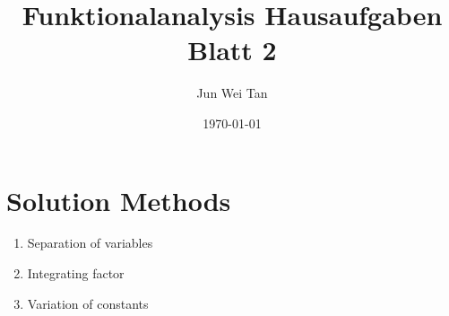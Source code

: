 \documentclass[prb,12pt]{revtex4-2}
\theoremstyle{definition}
\theoremstyle{definition}
\theoremstyle{definition}
\begin{document}
	\title{Funktionalanalysis Hausaufgaben Blatt 2}
	\author{Jun Wei Tan}
	\date{\today}
	\maketitle
	
	\section{Solution Methods}
	\begin{enumerate}
		\item Separation of variables
		\item Integrating factor
		\item Variation of constants
	\end{enumerate}
\end{document}
